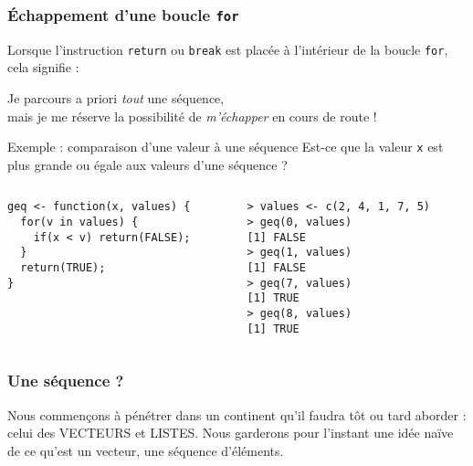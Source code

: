 \documentclass[10pt]{beamer}
\begin{document}
\begin{frame}[fragile]
  \frametitle{Échappement d'une boucle \texttt{for}}
  Lorsque l'instruction \texttt{return} ou \texttt{break} est placée à l'intérieur de la boucle \texttt{for}, cela signifie :
  \begin{center}
    \alert{Je parcours a priori \emph{tout} une séquence,\\ mais je me réserve la possibilité de \emph{m'échapper} en cours de route !}

  \end{center}
\begin{exampleblock}{Exemple : comparaison d'une valeur à une séquence}
  Est-ce que la valeur \texttt{x} est plus grande ou égale aux valeurs d’une séquence ?
\begin{columns}[t]
\begin{column}{0.48\textwidth}
  \begin{lstlisting}[style=editor]
geq <- function(x, values) {
  for(v in values) {
    if(x < v) return(FALSE);
  }
  return(TRUE);
}         
  \end{lstlisting}
\end{column}
\begin{column}{0.48\textwidth}
  \begin{lstlisting}
> values <- c(2, 4, 1, 7, 5)
> geq(0, values)
[1] FALSE
> geq(1, values)
[1] FALSE
> geq(7, values)
[1] TRUE
> geq(8, values)
[1] TRUE
\end{lstlisting}

\end{column}
\end{columns}
\end{exampleblock}
\end{frame}

\begin{frame}
  \frametitle{Une séquence ?}
  Nous commençons à pénétrer dans un continent qu'il faudra tôt ou tard aborder : celui des \alert{VECTEURS} et \alert{LISTES}.
  Nous garderons pour l'instant une idée naïve de ce qu'est un vecteur, une \alert{séquence d’éléments}.
\end{frame}
\end{document}

